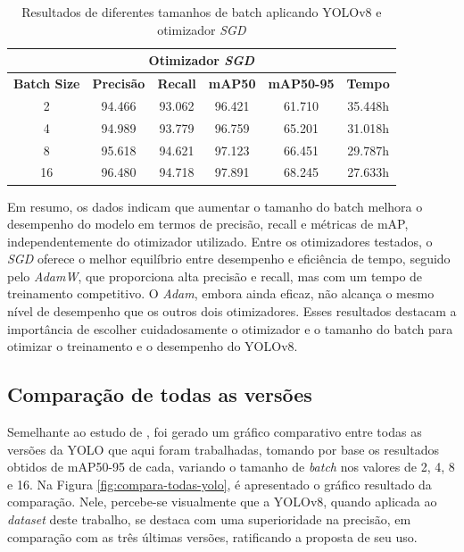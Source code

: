 \begin{table}[!hbt]
    \centering
    \begin{tabular}{|c|c|c|c|c|c|}
    \hline
    \multicolumn{6}{|c|}{\textbf{Otimizador \textit{SGD}}} \\ \hline
    \textbf{Batch Size} & \textbf{Precisão} & \textbf{Recall} & \textbf{mAP50} & \textbf{mAP50-95} & \textbf{Tempo} \\ \hline
    2                   & 94.466            & 93.062          & 96.421         & 61.710            & 35.448h        \\ \hline
    4                   & 94.989            & 93.779          & 96.759         & 65.201            & 31.018h        \\ \hline
    8                   & 95.618            & 94.621          & 97.123         & 66.451            & 29.787h        \\ \hline
    16                  & 96.480            & 94.718          & 97.891         & 68.245            & 27.633h        \\ \hline
    \end{tabular}
    \caption{Resultados de diferentes tamanhos de batch aplicando YOLOv8 e otimizador \textit{SGD}}
    \label{tab:yolov8-sgd}
\end{table}

Em resumo, os dados indicam que aumentar o tamanho do batch melhora o desempenho do modelo em termos de precisão, recall e métricas de mAP, independentemente do otimizador utilizado. Entre os otimizadores testados, o \textit{SGD} oferece o melhor equilíbrio entre desempenho e eficiência de tempo, seguido pelo \textit{AdamW}, que proporciona alta precisão e recall, mas com um tempo de treinamento competitivo. O \textit{Adam}, embora ainda eficaz, não alcança o mesmo nível de desempenho que os outros dois otimizadores. Esses resultados destacam a importância de escolher cuidadosamente o otimizador e o tamanho do batch para otimizar o treinamento e o desempenho do YOLOv8.

\subsection{Comparação de todas as versões}

Semelhante ao estudo de , foi gerado um gráfico comparativo entre todas as versões da YOLO que aqui foram trabalhadas, tomando por base os resultados obtidos de mAP50-95 de cada, variando o tamanho de \textit{batch} nos valores de 2, 4, 8 e 16. Na Figura \ref{fig:compara-todas-yolo}, é apresentado o gráfico resultado da comparação. Nele, percebe-se visualmente que a YOLOv8, quando aplicada ao \textit{dataset} deste trabalho, se destaca com uma superioridade na precisão, em comparação com as três últimas versões, ratificando a proposta de seu uso. 

